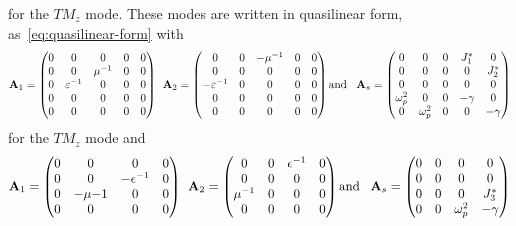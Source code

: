 for the $TM_z$ mode. These modes are written in quasilinear form, as~\eqref{eq:quasilinear-form} with
\begin{align*}
  \mathbf{A}_1 = 
  \begin{pmatrix}
    0 & 0 & 0 & 0 & 0 \\
    0 & 0 & \mu^{-1} & 0 & 0 \\
    0 & \varepsilon^{-1} & 0 & 0 & 0 \\
    0 & 0 & 0 & 0 & 0 \\
    0 & 0 & 0 & 0 & 0 \\
  \end{pmatrix}
  \: \:
  \mathbf{A}_2 = 
  \begin{pmatrix}
    0 & 0 &-\mu^{-1} & 0 & 0 \\
    0 & 0 & 0 & 0 & 0 \\
   -\varepsilon^{-1} & 0 & 0 & 0 & 0 \\
    0 & 0 & 0 & 0 & 0 \\
    0 & 0 & 0 & 0 & 0 \\
  \end{pmatrix}
  \textrm{and}\;\;\;
  \mathbf{A}_s = 
  \begin{pmatrix}
    0 & 0 & 0 & J_{1}^* & 0 \\
    0 & 0 & 0 & 0 & J_{2}^* \\
    0 & 0 & 0 & 0 & 0 \\
    \omega_p^2 & 0 & 0 & -\gamma & 0 \\
    0 & \omega_p^2 & 0 & 0 & -\gamma \\
  \end{pmatrix}
\end{align*}
for the $TM_z$ mode and 
\begin{align*}
  \mathbf{A}_1 = 
  \begin{pmatrix}
    0 & 0 & 0 & 0 \\
    0 & 0 &-\epsilon^{-1} & 0 \\
    0 &-\mu{-1} & 0 & 0 \\
    0 & 0 & 0 & 0 \\
  \end{pmatrix}
  \: \:
  \mathbf{A}_2 = 
  \begin{pmatrix}
    0 & 0 & \epsilon^{-1} & 0 \\
    0 & 0 & 0 & 0 \\
    \mu^{-1} & 0 & 0 & 0 \\
    0 & 0 & 0 & 0 \\
  \end{pmatrix}
  \textrm{and}\;\;\;
  \mathbf{A}_s = 
  \begin{pmatrix}
    0 & 0 & 0 & 0 \\
    0 & 0 & 0 & 0 \\
    0 & 0 & 0 & J_{3}^* \\
    0 & 0 & \omega_p^2 & -\gamma \\
  \end{pmatrix}
\end{align*}

